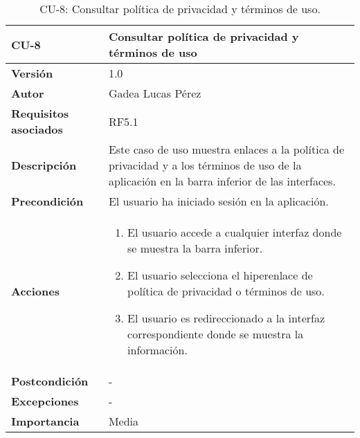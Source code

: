 \begin{table}[p]
\centering
\begin{tabularx}{\linewidth}{ p{} p{} }
\toprule
\textbf{CU-8} & \textbf{Consultar política de privacidad y términos de uso}\\
\toprule
\textbf{Versión} & 1.0 \\
\textbf{Autor} & Gadea Lucas Pérez \\
\textbf{Requisitos asociados} & RF5.1 \\
\textbf{Descripción} & Este caso de uso muestra enlaces a la política de privacidad y a los términos de uso de la aplicación en la barra inferior de las interfaces.\\
\textbf{Precondición} & El usuario ha iniciado sesión en la aplicación.\\
\textbf{Acciones} &
\begin{enumerate}
\def\labelenumi{\arabic{enumi}.}
\tightlist
\item El usuario accede a cualquier interfaz donde se muestra la barra inferior.
\item El usuario selecciona el hiperenlace de política de privacidad o términos de uso.
\item El usuario es redireccionado a la interfaz correspondiente donde se muestra la información.
\end{enumerate}\\ 
\textbf{Postcondición} & - \\
\textbf{Excepciones} & - \\
\textbf{Importancia} & Media \\
\bottomrule
\end{tabularx}
\caption{CU-8: Consultar política de privacidad y términos de uso.}
\label{tab:cu8}
\end{table}

